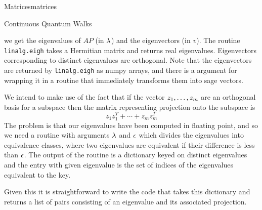 \begin{chap}{Matrices}{matrices}
\begin{sect}{Continuous Quantum Walks}
%
\begin{para}
we get the eigenvalues of $AP$ (in $\lambda$) and the eigenvectors (in \(v\)).
The routine \verb|linalg.eigh| takes a Hermitian matrix and returns real eigenvalues.
Eigenvectors corresponding to distinct eigenvalues are orthogonal. Note that the
eigenvectors are returned by
\verb|linalg.eigh| as numpy arrays, and there is a argument for
wrapping it in a routine that immediately transforms them into sage vectors.
\end{para}
%
\begin{para}
We intend to make use of the fact that if the vector $z_{1},\ldots,z_{m}$ are an orthogonal basis
for a subspace then the matrix representing projection onto the subspace is
\[
    z_1z_1^T+\cdots+z_mz_m^T
\]
The problem is that our eigenvalues have been computed in floating point, and
so we need a routine with arguments $\lambda$ and $\epsilon$ which divides the
eigenvalues into equivalence classes, where two eigenvalues are equivalent if their
difference is less than $\epsilon$. The output of the routine
is a dictionary keyed on distinct eigenvalues and the entry with given eigenvalue
is the set of indices of the eigenvalues equivalent to the key.
\end{para}
%
\begin{para}
Given this it is straightforward to write the code that takes this dictionary and
returns a list of pairs consisting of an eigenvalue and its associated projection.
\end{para}
%
\end{sect}
%
\end{chap}